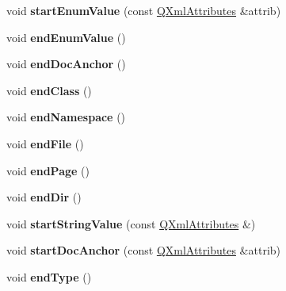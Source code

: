 \begin{DoxyCompactItemize}
void {\bfseries start\+Enum\+Value} (const \mbox{\hyperlink{class_q_xml_attributes}{Q\+Xml\+Attributes}} \&attrib)
\item 
\mbox{\label{class_tag_file_parser_a707d4cc38038eb4108c949b91e75121c}} 
void {\bfseries end\+Enum\+Value} ()
\item 
\mbox{\label{class_tag_file_parser_aa00881e9a81fccda41ab9111261c2b58}} 
void {\bfseries end\+Doc\+Anchor} ()
\item 
\mbox{\label{class_tag_file_parser_a9e3e83215c3dc1433589d72835c16dba}} 
void {\bfseries end\+Class} ()
\item 
\mbox{\label{class_tag_file_parser_a604566afd5d8237b6a8626d30b1b1902}} 
void {\bfseries end\+Namespace} ()
\item 
\mbox{\label{class_tag_file_parser_aefa0fddc21d84d09769eb62690a6bf93}} 
void {\bfseries end\+File} ()
\item 
\mbox{\label{class_tag_file_parser_ae85e845d46b1032f51d6efd833bc5061}} 
void {\bfseries end\+Page} ()
\item 
\mbox{\label{class_tag_file_parser_af425bde6cf85ebc042b01decc1370eda}} 
void {\bfseries end\+Dir} ()
\item 
\mbox{\label{class_tag_file_parser_a6a6319a60a875f3771ba420465691dab}} 
void {\bfseries start\+String\+Value} (const \mbox{\hyperlink{class_q_xml_attributes}{Q\+Xml\+Attributes}} \&)
\item 
\mbox{\label{class_tag_file_parser_adbba8c8baa5115e73376f94529395010}} 
void {\bfseries start\+Doc\+Anchor} (const \mbox{\hyperlink{class_q_xml_attributes}{Q\+Xml\+Attributes}} \&attrib)
\item 
\mbox{\label{class_tag_file_parser_aa93bd22b0121cafa26c559948c98acce}} 
void {\bfseries end\+Type} ()
\item 
\mbox{\label{class_tag_file_parser_ac070eedd9f9f365fccc7519e30ca66c2}} 

\end{DoxyCompactItemize}
